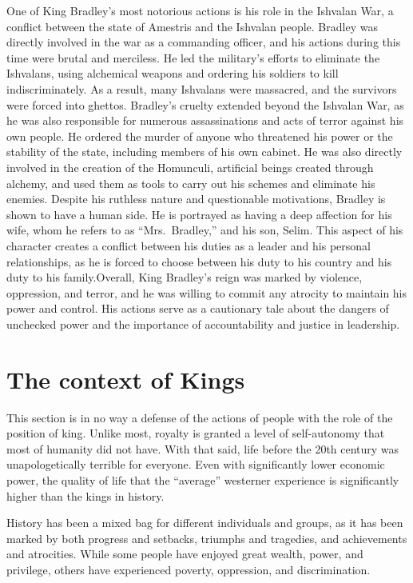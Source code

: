 \documentclass[
]{article}
\begin{document}
One of King Bradley's most notorious actions is his role in the Ishvalan
War, a conflict between the state of Amestris and the Ishvalan people.
Bradley was directly involved in the war as a commanding officer, and
his actions during this time were brutal and merciless. He led the
military's efforts to eliminate the Ishvalans, using alchemical weapons
and ordering his soldiers to kill indiscriminately. As a result, many
Ishvalans were massacred, and the survivors were forced into ghettos.
Bradley's cruelty extended beyond the Ishvalan War, as he was also
responsible for numerous assassinations and acts of terror against his
own people. He ordered the murder of anyone who threatened his power or
the stability of the state, including members of his own cabinet. He was
also directly involved in the creation of the Homunculi, artificial
beings created through alchemy, and used them as tools to carry out his
schemes and eliminate his enemies. Despite his ruthless nature and
questionable motivations, Bradley is shown to have a human side. He is
portrayed as having a deep affection for his wife, whom he refers to as
``Mrs.~Bradley,'' and his son, Selim. This aspect of his character
creates a conflict between his duties as a leader and his personal
relationships, as he is forced to choose between his duty to his country
and his duty to his family.Overall, King Bradley's reign was marked by
violence, oppression, and terror, and he was willing to commit any
atrocity to maintain his power and control. His actions serve as a
cautionary tale about the dangers of unchecked power and the importance
of accountability and justice in leadership.

\hypertarget{the-context-of-kings}{%
\section{The context of Kings}\label{the-context-of-kings}}

This section is in no way a defense of the actions of people with the
role of the position of king. Unlike most, royalty is granted a level of
self-autonomy that most of humanity did not have. With that said, life
before the 20th century was unapologetically terrible for everyone. Even
with significantly lower economic power, the quality of life that the
``average'' westerner experience is significantly higher than the kings
in history.

History has been a mixed bag for different individuals and groups, as it
has been marked by both progress and setbacks, triumphs and tragedies,
and achievements and atrocities. While some people have enjoyed great
wealth, power, and privilege, others have experienced poverty,
oppression, and discrimination.
\end{document}
